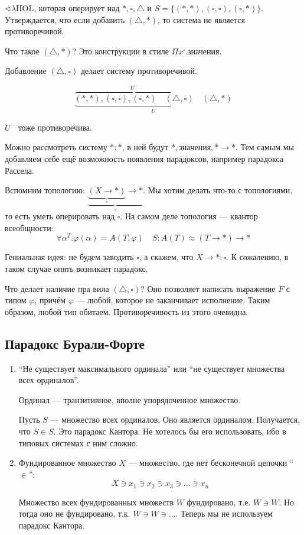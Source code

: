 \(\sphericalangle \lambda \mathrm{HOL}\), которая оперирует над \(*, \square, \triangle\) и \(S = \{(*,*), (\square,\square), (\square,*)\}\). Утверждается, что если добавить \((\triangle,*)\), то система не является противоречивой.

Что такое \((\triangle,*)\)? Это конструкции в стиле \(\Pi x^\square.\text{значения}\).

Добавление \((\triangle, \square)\) делает систему противоречивой.

\[\underbrace{\overbrace{(*,*), (\square,\square), (\square,*) \quad (\triangle, \square)}^{U^-} \quad (\triangle,*)}_U\]

\(U^-\) тоже противоречива.

Можно рассмотреть систему \(*:*\), в ней будут \(*,\mathrm{значения},* \to *\). Тем самым мы добавляем себе ещё возможность появления парадоксов, например парадокса Рассела.

Вспомним топологию: \(\underbrace{\underbrace{(X \to *)}_\square \to *}_\square\). Мы хотим делать что-то с топологиями, то есть уметь оперировать над \(\square\). На самом деле топология --- квантор всеобщности:
\[\forall \alpha^T.\varphi(\alpha) = A(T, \varphi) \quad S : A(T) \approx (T \to *) \to *\]

Гениальная идея: не будем заводить \(\square\), а скажем, что \(X \to * : \square\). К сожалению, в таком случае опять возникает парадокс.

Что делает наличие пра вила \((\triangle, \square)\)? Оно позволяет написать выражение \(F\) с типом \(\varphi\), причём \(\varphi\) --- любой, которое не заканчивает исполнение. Таким образом, любой тип обитаем. Противоречивость из этого очевидна.

\subsection{Парадокс Бурали-Форте}

\begin{enumerate}
    \item ``Не существует максимального ординала'' или ``не существует множества всех ординалов''.

          \begin{definition}
              Ординал --- транзитивное, вполне упорядоченное множество.
          \end{definition}

          Пусть \(S\) --- множество всех ординалов. Оно является ординалом. Получается, что \(S \in S\). Это парадокс Кантора. Не хотелось бы его использовать, ибо в типовых системах с ним сложно.

    \item  Фундированное множество \(X\) --- множество, где нет бесконечной цепочки ``\(\in\)'':
          \[X \ni x_1 \ni x_2 \ni x_3 \ni \dots \ni x_n\]

          Множество всех фундированных множеств \(W\) фундировано, т.е. \(W \ni W\). Но тогда оно не фундировано, т.к. \(W \ni W \ni \dots\). Теперь мы не используем парадокс Кантора.
\end{enumerate}

